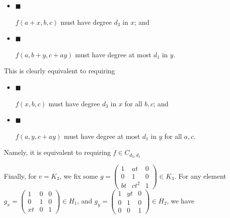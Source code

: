 \begin{itemize}


\item[] 
$\blacksquare$ 


$f(a+x,b,c)$ must have degree $d_{3}$ in $x$; and\par





\item[] 
$\blacksquare$ 


$f(a,b+y,c+ay)$ must have degree at most $d_{1}$ in $y$.\par





\end{itemize}


This is clearly equivalent to requiring\par


\begin{itemize}


\item[] 
$\blacksquare$ 


$f(x,b,c)$ must have degree $d_{3}$ in $x$ for all $b,c$; and\par





\item[] 
$\blacksquare$ 


$f(a,y,c+ay)$ must have degree at most $d_{1}$ in $y$ for all $a,c$.\par





\end{itemize}


Namely, it is equivalent to requiring $f\in C_{d_{3},d_{1}}$\par




Finally, for $v=K_{3}$, we
fix some $g=\begin{pmatrix}1&at&0\\
0&1&0\\
bt&ct^{2}&1\end{pmatrix}\in K_{3}$. For any element $g_{x}=\begin{pmatrix}1&0&0\\
0&1&0\\
xt&0&1\end{pmatrix}\in H_{1}$, and $g_{y}=\begin{pmatrix}1&yt&0\\
0&1&0\\
0&0&1\end{pmatrix}\in H_{2}$, we have\par


